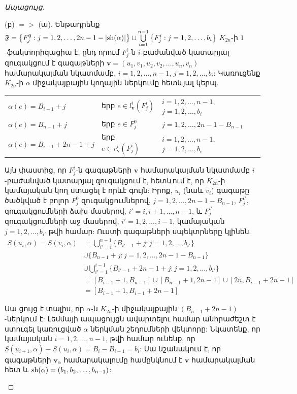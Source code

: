 \begin{hide}
\begin{proof}[Ապացույց]
\begin{description}
\item{(բ) $=>$ (ա)}. Ենթադրենք $\mathfrak{F} = 
\left\{ F^0_j : j=1,2,\ldots,2n-1-|{\rm sh}(\alpha)| \right\}
\cup
\bigcup\limits_{i=1}^{n-1}\left\{F^i_j : j=1,2,\ldots,b_i\right\}$ $K_{2n}$-ի $1$-ֆակտորիզացիա է, ընդ որում $F_j^i$-ն $i$-բաժանված կատարյալ զուգակցում է գագաթների $\mathbf{v}=\left(u_1,v_1, u_2,v_2, \ldots,u_n,v_n\right)$ համարակալման նկատմամբ, $i=1,2,\ldots,n-1$, $j=1,2,\ldots,b_i$: Կառուցենք $K_{2n}$-ի $\alpha$ միջակայքային կողային ներկումը հետևյալ կերպ.

\begin{tabular}{lll}
$\alpha(e)=B_{i-1} + j$ & երբ $e \in l_{\mathbf{v}}^i(F_j^i)$ & $i=1,2,\ldots,n-1$, $j=1,2,\ldots,b_i$ \\
$\alpha(e)=B_{n-1} + j$ & երբ $e \in F_j^0$ & $j=1,2,\ldots,2n-1-B_{n-1}$\\
$\alpha(e)=B_{i-1} + 2n - 1 + j$ & երբ $e \in r_{\mathbf{v}}^i(F_j^i)$ & $i=1,2,\ldots,n-1$, $j=1,2,\ldots,b_i$
\end{tabular}

Այն փաստից, որ $F^i_j$-ն գագաթների $\mathbf{v}$ համարակալման նկատմամբ $i$-բաժանված կատարյալ զուգակցում է, հետևում է, որ $K_{2n}$-ի կամայական կող ստացել է որևէ գույն: Իրոք, $u_i$ (նաև $v_i$) գագաթը ծածկված է բոլոր $F_j^0$ զուգակցումներով, $j=1,2,\ldots,2n-1-B_{n-1}$, $F_j^{i'}$, զուգակցումների ձախ մասերով, $i'=i,i+1,\ldots,n-1$, և $F_j^{i'}$ զուգակցումների աջ մասերով, $i'=1,2,\ldots,i-1$, կամայական $j=1,2,\ldots,b_{i'}$ թվի համար: Ուստի գագաթների սպեկտրները կլինեն.
\begin{align*}
S(u_i, \alpha) = S(v_i, \alpha) &= \bigcup\limits_{i'=i}^{n-1}\{B_{i'-1} + j  : j=1,2,\ldots,b_{i'}\} \\
& \cup
\{B_{n-1} + j : j=1,2,\ldots,2n-1-B_{n-1}\} \\
& \cup
\bigcup\limits_{i'=1}^{i-1}\{B_{i'-1} + 2n-1 + j  : j=1,2,\ldots,b_{i'}\}\\
&= [B_{i-1}+1, B_{n-1}] \cup [B_{n-1}+1, 2n-1] \cup [2n, B_{i-1}+2n-1]\\
&= [B_{i-1}+1, B_{i-1}+2n-1]
\end{align*}

Սա ցույց է տալիս, որ $\alpha$-ն $K_{2n}$-ի  միջակայքային $(B_{n-1} + 2n-1)$-ներկում է: Լեմմայի ապացույցն ավարտելու համար անհրաժեշտ է ստուգել կառուցված $\alpha$ ներկման շեղումների վեկտորը: Նկատենք, որ կամայական $i=1,2,\ldots,n-1$, թվի համար ունենք, որ $\underline{S}(u_{i+1}, \alpha) - \underline{S}(u_{i}, \alpha) = B_{i}-B_{i-1} = b_i$: Սա նշանակում է, որ գագաթների $\mathbf{v}_\alpha$ համարակալումը համընկնում է $\mathbf{v}$ համարակալման հետ և ${\rm sh}(\alpha) = (b_1, b_2, \ldots, b_{n-1})$:
\end{description}


\end{proof}
\end{hide}
